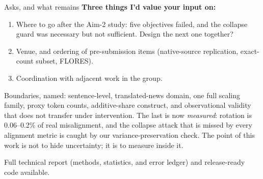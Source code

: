 \documentclass[aspectratio=169,11pt]{beamer}
\begin{document}
\begin{frame}{Asks, and what remains}
\textbf{Three things I'd value your input on:}
\begin{enumerate}\itemsep=1.5mm
  \item Where to go after the Aim-2 study: five objectives failed, and the
  collapse guard was necessary but not sufficient. Design the next one together?
  \item Venue, and ordering of pre-submission items (native-source
  replication, exact-count subset, FLORES).
  \item Coordination with adjacent work in the group.
\end{enumerate}
\vspace{3mm}
\small Boundaries, named: sentence-level, translated-news domain, one full
scaling family, proxy token counts, additive-share construct, and
observational validity that does not transfer under intervention. The last is now \emph{measured}: rotation is 0.06--0.2\% of real misalignment, and the
collapse attack that is missed by every alignment metric is caught by our
variance-preservation check. The point
of this work is not to hide uncertainty; it is to measure inside it.
\vspace{2mm}

\centering \footnotesize Full technical report (methods, statistics, and error ledger) and release-ready code available.
\end{frame}
\end{document}
